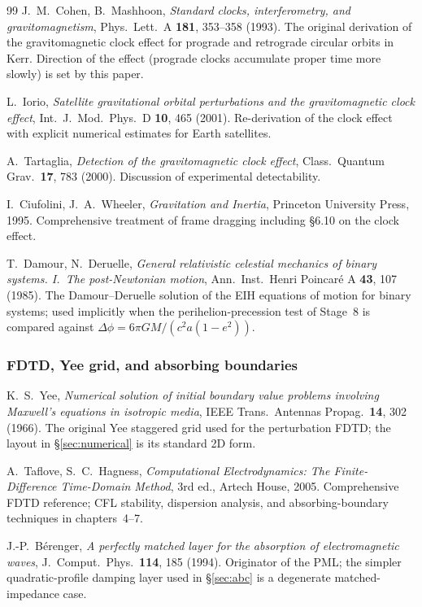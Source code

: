 \documentclass[11pt,a4paper]{article}
\begin{document}
\begin{thebibliography}{99}
J.~M.~Cohen, B.~Mashhoon, \emph{Standard clocks, interferometry, and
gravitomagnetism}, Phys.~Lett.~A \textbf{181}, 353--358 (1993).  The
original derivation of the gravitomagnetic clock effect for prograde
and retrograde circular orbits in Kerr.  Direction of the effect
(prograde clocks accumulate proper time more slowly) is set by this
paper.

L.~Iorio, \emph{Satellite gravitational orbital perturbations and the
gravitomagnetic clock effect}, Int.~J.~Mod.~Phys.~D \textbf{10}, 465
(2001).  Re-derivation of the clock effect with explicit numerical
estimates for Earth satellites.

A.~Tartaglia, \emph{Detection of the gravitomagnetic clock effect},
Class.~Quantum Grav.~\textbf{17}, 783 (2000).  Discussion of
experimental detectability.

I.~Ciufolini, J.~A.~Wheeler, \emph{Gravitation and Inertia},
Princeton University Press, 1995.  Comprehensive treatment of frame
dragging including \S6.10 on the clock effect.

T.~Damour, N.~Deruelle, \emph{General relativistic celestial
mechanics of binary systems. I.~The post-Newtonian motion},
Ann.~Inst.~Henri Poincar\'e A \textbf{43}, 107 (1985).  The
Damour--Deruelle solution of the EIH equations of motion for binary
systems; used implicitly when the perihelion-precession test of
Stage~8 is compared against $\Delta\phi = 6\pi GM/(c^2 a(1-e^2))$.

\subsubsection*{FDTD, Yee grid, and absorbing boundaries}

K.~S.~Yee, \emph{Numerical solution of initial boundary value problems
involving Maxwell's equations in isotropic media}, IEEE
Trans.~Antennas Propag.~\textbf{14}, 302 (1966).  The original Yee
staggered grid used for the perturbation FDTD; the layout in
\S\ref{sec:numerical} is its standard 2D form.

A.~Taflove, S.~C.~Hagness, \emph{Computational Electrodynamics: The
Finite-Difference Time-Domain Method}, 3rd ed., Artech House, 2005.
Comprehensive FDTD reference; CFL stability, dispersion analysis, and
absorbing-boundary techniques in chapters~4--7.

J.-P.~B\'erenger, \emph{A perfectly matched layer for the absorption
of electromagnetic waves}, J.~Comput.~Phys.~\textbf{114}, 185 (1994).
Originator of the PML; the simpler quadratic-profile damping layer
used in \S\ref{sec:abc} is a degenerate matched-impedance case.


\end{thebibliography}
\end{document}
